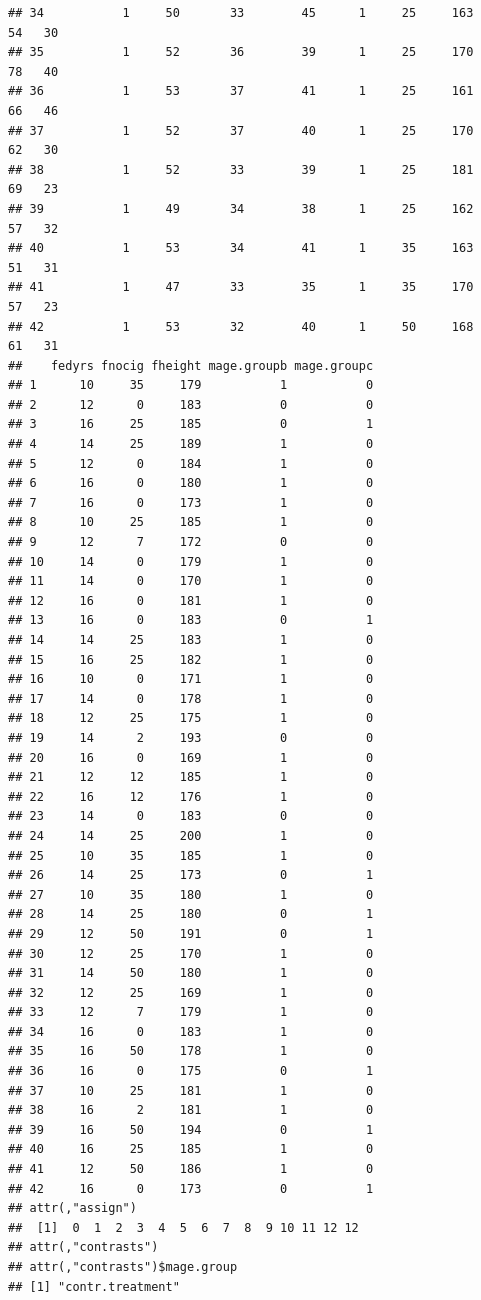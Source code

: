 \documentclass[
]{book}
\begin{document}
\begin{verbatim}
## 34           1     50       33        45      1     25     163    54   30
## 35           1     52       36        39      1     25     170    78   40
## 36           1     53       37        41      1     25     161    66   46
## 37           1     52       37        40      1     25     170    62   30
## 38           1     52       33        39      1     25     181    69   23
## 39           1     49       34        38      1     25     162    57   32
## 40           1     53       34        41      1     35     163    51   31
## 41           1     47       33        35      1     35     170    57   23
## 42           1     53       32        40      1     50     168    61   31
##    fedyrs fnocig fheight mage.groupb mage.groupc
## 1      10     35     179           1           0
## 2      12      0     183           0           0
## 3      16     25     185           0           1
## 4      14     25     189           1           0
## 5      12      0     184           1           0
## 6      16      0     180           1           0
## 7      16      0     173           1           0
## 8      10     25     185           1           0
## 9      12      7     172           0           0
## 10     14      0     179           1           0
## 11     14      0     170           1           0
## 12     16      0     181           1           0
## 13     16      0     183           0           1
## 14     14     25     183           1           0
## 15     16     25     182           1           0
## 16     10      0     171           1           0
## 17     14      0     178           1           0
## 18     12     25     175           1           0
## 19     14      2     193           0           0
## 20     16      0     169           1           0
## 21     12     12     185           1           0
## 22     16     12     176           1           0
## 23     14      0     183           0           0
## 24     14     25     200           1           0
## 25     10     35     185           1           0
## 26     14     25     173           0           1
## 27     10     35     180           1           0
## 28     14     25     180           0           1
## 29     12     50     191           0           1
## 30     12     25     170           1           0
## 31     14     50     180           1           0
## 32     12     25     169           1           0
## 33     12      7     179           1           0
## 34     16      0     183           1           0
## 35     16     50     178           1           0
## 36     16      0     175           0           1
## 37     10     25     181           1           0
## 38     16      2     181           1           0
## 39     16     50     194           0           1
## 40     16     25     185           1           0
## 41     12     50     186           1           0
## 42     16      0     173           0           1
## attr(,"assign")
##  [1]  0  1  2  3  4  5  6  7  8  9 10 11 12 12
## attr(,"contrasts")
## attr(,"contrasts")$mage.group
## [1] "contr.treatment"
\end{verbatim}
\end{document}
